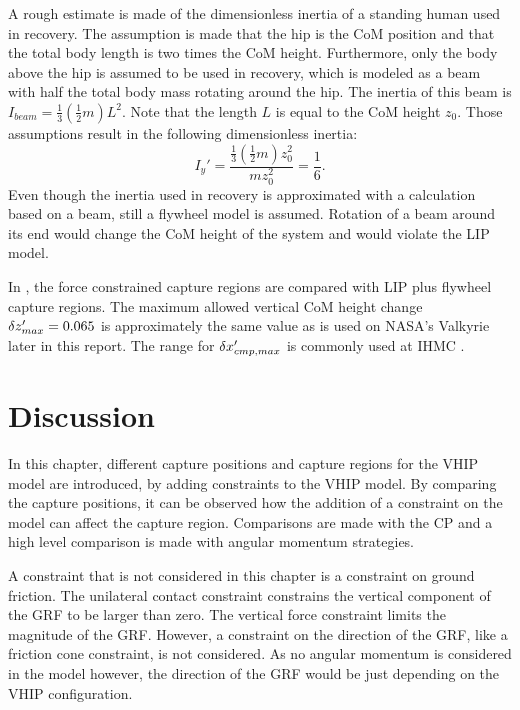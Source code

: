 A rough estimate is made of the dimensionless inertia of a standing human used in recovery. The assumption is made that the hip is the \ac{CoM} position \cite{gard2004comparison} and that the total body length is two times the \ac{CoM} height. Furthermore, only the body above the hip is assumed to be used in recovery, which is modeled as a beam with half the total body mass rotating around the hip. The inertia of this beam is $I_{beam} = \frac{1}{3}(\frac{1}{2}m)L^2$. Note that the length $L$ is equal to the \ac{CoM} height $z_0$. Those assumptions result in the following dimensionless inertia:
\begin{equation}
	I_y' = \frac{\frac{1}{3}(\frac{1}{2}m)z_0^2}{mz_0^2} = \frac{1}{6}.
\end{equation}
Even though the inertia used in recovery is approximated with a calculation based on a beam, still a flywheel model is assumed. Rotation of a beam around its end would change the \ac{CoM} height of the system and would violate the \ac{LIP} model.

In , the force constrained capture regions are compared with \ac{LIP} plus flywheel capture regions. The maximum allowed vertical \ac{CoM} height change $\delta z_{max}' =0.065$ is approximately the same value as is used on NASA's Valkyrie later in this report. The range for $\delta x_{cmp,max}'$ is commonly used at \ac{IHMC} \cite{griffin2017natural}.

\section{Discussion}
In this chapter, different capture positions and capture regions for the \ac{VHIP} model are introduced, by adding constraints to the \ac{VHIP} model. By comparing the capture positions, it can be observed how the addition of a constraint on the model can affect the capture region. Comparisons are made with the \ac{CP} and a high level comparison is made with angular momentum strategies.

A constraint that is not considered in this chapter is a constraint on ground friction. The unilateral contact constraint constrains the vertical component of the \ac{GRF} to be larger than zero. The vertical force constraint limits the magnitude of the \ac{GRF}. However, a constraint on the direction of the \ac{GRF}, like a friction cone constraint, is not considered. As no angular momentum is considered in the model however, the direction of the \ac{GRF} would be just depending on the \ac{VHIP} configuration.

